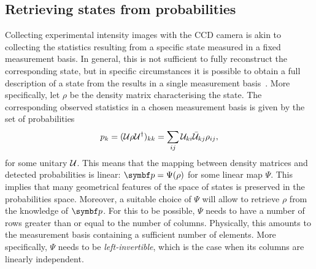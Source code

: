 \subsection{Retrieving states from probabilities}

Collecting experimental intensity images with the \ac{CCD} camera is akin to collecting the statistics resulting from a specific state measured in a fixed measurement basis.
In general, this is not sufficient to fully reconstruct the corresponding state, but in specific circumstances it is possible to obtain a full description of a state from the results in a single measurement basis~\cite{banchi2018multiphoton}.
More specifically, let $\rho$ be the density matrix characterising the state. The corresponding observed statistics in a chosen measurement basis is given by the set of probabilities
\begin{equation}
	p_k = ({\mathcal{U}}\rho{\mathcal{U}}^\dagger)_{kk}
	    = \sum_{ij}{\mathcal{U}}_{ki}\bar{{\mathcal{U}}}_{kj}\rho_{ij},
\end{equation}
for some unitary ${\mathcal{U}}$.
This means that the mapping between density matrices and detected probabilities is linear: $\bs p=\Psi(\rho)$ for some linear map $\Psi$. This implies that many geometrical features of the space of states is preserved in the probabilities space. Moreover, a suitable choice of $\Psi$ will allow to retrieve $\rho$ from the knowledge of $\bs p$.
For this to be possible, $\Psi$ needs to have a number of rows greater than or equal to the number of columns. Physically, this amounts to the measurement basis containing a sufficient number of elements. More specifically, $\Psi$ needs to be \emph{left-invertible}, which is the case when its columns are linearly independent.


